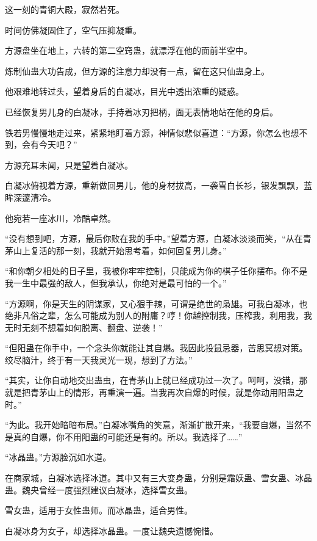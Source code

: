 
\begin{this_body}

这一刻的青铜大殿，寂然若死。

时间仿佛凝固住了，空气压抑凝重。

方源盘坐在地上，六转的第二空窍蛊，就漂浮在他的面前半空中。

炼制仙蛊大功告成，但方源的注意力却没有一点，留在这只仙蛊身上。

他艰难地转过头，望着身后的白凝冰，目光中透出浓重的疑惑。

已经恢复男儿身的白凝冰，手持着冰刃把柄，面无表情地站在他的身后。

铁若男慢慢地走过来，紧紧地盯着方源，神情似悲似喜道：“方源，你怎么也想不到，会有今天吧？”

方源充耳未闻，只是望着白凝冰。

白凝冰俯视着方源，重新做回男儿，他的身材拔高，一袭雪白长衫，银发飘飘，蓝眸深邃清冷。

他宛若一座冰川，冷酷卓然。

“没有想到吧，方源，最后你败在我的手中。”望着方源，白凝冰淡淡而笑，“从在青茅山上复活的那一刻，我就开始思考着，如何回复男儿身。”

“和你朝夕相处的日子里，我被你牢牢控制，只能成为你的棋子任你摆布。你不是我一生中最强的敌人，但我承认，你绝对是最可怕的一个。”

“方源啊，你是天生的阴谋家，又心狠手辣，可谓是绝世的枭雄。可我白凝冰，也绝非凡俗之辈，怎么可能成为别人的附庸？哼！你越控制我，压榨我，利用我，我无时无刻不想着如何脱离、翻盘、逆袭！”

“但阳蛊在你手中，一个念头你就能让其自爆。我因此投鼠忌器，苦思冥想对策。绞尽脑汁，终于有一天我灵光一现，想到了方法。”

“其实，让你自动地交出蛊虫，在青茅山上就已经成功过一次了。呵呵，没错，那就是把青茅山上的情形，再重演一遍。当我再次自爆的时候，就是你动用阳蛊之时。”

“为此。我开始暗暗布局。”白凝冰嘴角的笑意，渐渐扩散开来，“我要自爆，当然不是真的自爆，你不用阳蛊的可能还是有的。所以。我选择了……”

“冰晶蛊。”方源脸沉如水道。

在商家城，白凝冰选择冰道。其中又有三大变身蛊，分别是霜妖蛊、雪女蛊、冰晶蛊。魏央曾经一度强烈建议白凝冰，选择雪女蛊。

雪女蛊，适用于女性蛊师。而冰晶蛊，适合男性。

白凝冰身为女子，却选择冰晶蛊。一度让魏央遗憾惋惜。


\end{this_body}
